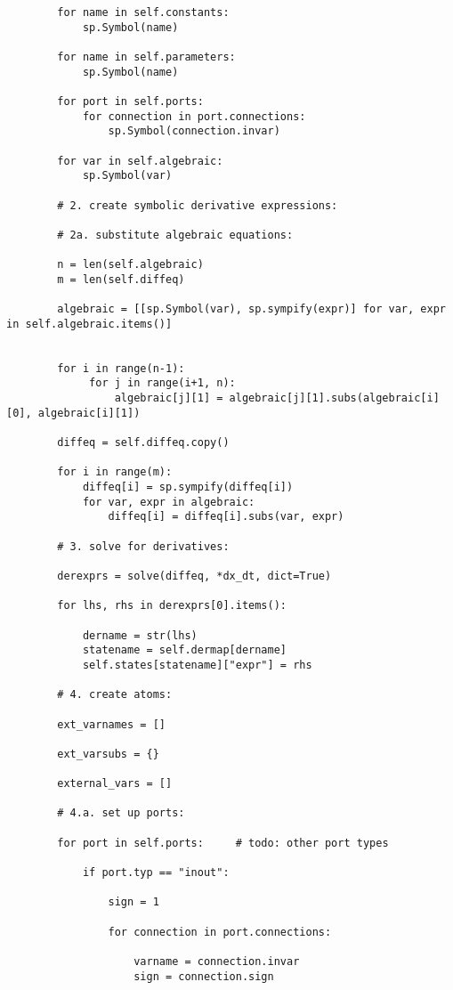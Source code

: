 \begin{lstlisting}
        for name in self.constants:
            sp.Symbol(name)

        for name in self.parameters:
            sp.Symbol(name)

        for port in self.ports:
            for connection in port.connections:
                sp.Symbol(connection.invar)

        for var in self.algebraic:
            sp.Symbol(var)

        # 2. create symbolic derivative expressions:

        # 2a. substitute algebraic equations:

        n = len(self.algebraic)
        m = len(self.diffeq)

        algebraic = [[sp.Symbol(var), sp.sympify(expr)] for var, expr in self.algebraic.items()]


        for i in range(n-1):
             for j in range(i+1, n):
                 algebraic[j][1] = algebraic[j][1].subs(algebraic[i][0], algebraic[i][1])

        diffeq = self.diffeq.copy()

        for i in range(m):
            diffeq[i] = sp.sympify(diffeq[i])
            for var, expr in algebraic:
                diffeq[i] = diffeq[i].subs(var, expr)

        # 3. solve for derivatives:

        derexprs = solve(diffeq, *dx_dt, dict=True)

        for lhs, rhs in derexprs[0].items():

            dername = str(lhs)
            statename = self.dermap[dername]
            self.states[statename]["expr"] = rhs

        # 4. create atoms:

        ext_varnames = []

        ext_varsubs = {}

        external_vars = []

        # 4.a. set up ports:

        for port in self.ports:     # todo: other port types

            if port.typ == "inout":

                sign = 1

                for connection in port.connections:

                    varname = connection.invar
                    sign = connection.sign


\end{lstlisting}
